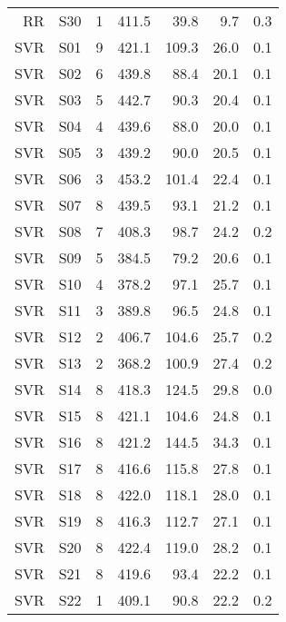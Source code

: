 \begin{table}
\begin{tabular}{rrrrrrr}
   RR &  S30 &             1 &   411.5 &  39.8 &          9.7 &    0.3 \\
  SVR &  S01 &             9 &   421.1 & 109.3 &         26.0 &    0.1 \\
  SVR &  S02 &             6 &   439.8 &  88.4 &         20.1 &    0.1 \\
  SVR &  S03 &             5 &   442.7 &  90.3 &         20.4 &    0.1 \\
  SVR &  S04 &             4 &   439.6 &  88.0 &         20.0 &    0.1 \\
  SVR &  S05 &             3 &   439.2 &  90.0 &         20.5 &    0.1 \\
  SVR &  S06 &             3 &   453.2 & 101.4 &         22.4 &    0.1 \\
  SVR &  S07 &             8 &   439.5 &  93.1 &         21.2 &    0.1 \\
  SVR &  S08 &             7 &   408.3 &  98.7 &         24.2 &    0.2 \\
  SVR &  S09 &             5 &   384.5 &  79.2 &         20.6 &    0.1 \\
  SVR &  S10 &             4 &   378.2 &  97.1 &         25.7 &    0.1 \\
  SVR &  S11 &             3 &   389.8 &  96.5 &         24.8 &    0.1 \\
  SVR &  S12 &             2 &   406.7 & 104.6 &         25.7 &    0.2 \\
  SVR &  S13 &             2 &   368.2 & 100.9 &         27.4 &    0.2 \\
  SVR &  S14 &             8 &   418.3 & 124.5 &         29.8 &    0.0 \\
  SVR &  S15 &             8 &   421.1 & 104.6 &         24.8 &    0.1 \\
  SVR &  S16 &             8 &   421.2 & 144.5 &         34.3 &    0.1 \\
  SVR &  S17 &             8 &   416.6 & 115.8 &         27.8 &    0.1 \\
  SVR &  S18 &             8 &   422.0 & 118.1 &         28.0 &    0.1 \\
  SVR &  S19 &             8 &   416.3 & 112.7 &         27.1 &    0.1 \\
  SVR &  S20 &             8 &   422.4 & 119.0 &         28.2 &    0.1 \\
  SVR &  S21 &             8 &   419.6 &  93.4 &         22.2 &    0.1 \\
  SVR &  S22 &             1 &   409.1 &  90.8 &         22.2 &    0.2 \\

\end{tabular}
\end{table}
